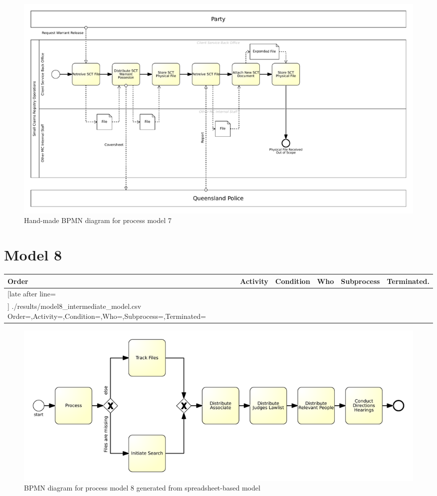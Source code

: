 \begin{figure}[H]
	\centering
	\includegraphics[width=\hsize]{./bpmn/model7.pdf}
	\caption{Hand-made BPMN diagram for process model 7}
	\label{bpmn:model7}
\end{figure}

\section{Model 8}
\begin{tcolorbox}[
	breakable,
	arc=0mm,
	left=1pt,
	right = 1pt,
	boxrule=0mm,
	colback = {white},
	]
	\texttt{}
\end{tcolorbox}
\label{txt:model8}
\newpage
{\scriptsize
	\begin{longtable}{|p{0.03 \hsize}|p{0.25 \hsize}|p{0.15 \hsize}|p{0.2 \hsize}|p{0.1 \hsize}|p{0.1 \hsize}|}
		\hline
		Order & Activity & Condition & Who & Subprocess & Terminated.
		\\\hline\hline
		\csvreader[late after line=\\\hline]
		{./results/model8_intermediate_model.csv}
		{Order=\Order,Activity=\Activity,Condition=\Condition,Who=\Who,Subprocess=\Subprocess,Terminated=\Terminated}
		{\Order & \Activity & \Condition & \Who & \Subprocess & \Terminated}
		\caption{Spreadsheet-based description for process model 8}
		\label{csv:model8}
	\end{longtable}
}

\begin{figure}[H]
	\centering
	\includegraphics[width=\hsize]{./generated_bpmn/model8.pdf}
	\caption{BPMN diagram for process model 8 generated from spreadsheet-based model}
	\label{bpmn:generated_model8}
\end{figure}

